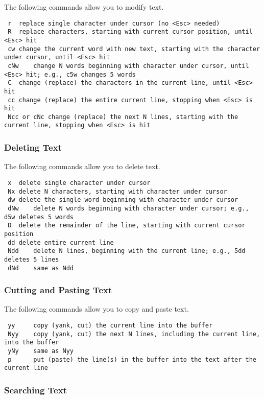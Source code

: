 The following commands allow you to modify text.

\begin{lstlisting}
 r	replace single character under cursor (no <Esc> needed)
 R	replace characters, starting with current cursor position, until <Esc> hit
 cw	change the current word with new text, starting with the character under cursor, until <Esc> hit
 cNw	change N words beginning with character under cursor, until <Esc> hit; e.g., c5w changes 5 words
 C	change (replace) the characters in the current line, until <Esc> hit
 cc	change (replace) the entire current line, stopping when <Esc> is hit
 Ncc or cNc	change (replace) the next N lines, starting with the current line, stopping when <Esc> is hit
\end{lstlisting}


\subsubsection{Deleting Text}

The following commands allow you to delete text.

\begin{lstlisting}
 x	delete single character under cursor
 Nx	delete N characters, starting with character under cursor
 dw	delete the single word beginning with character under cursor
 dNw	delete N words beginning with character under cursor; e.g., d5w deletes 5 words
 D	delete the remainder of the line, starting with current cursor position
 dd	delete entire current line
 Ndd 	delete N lines, beginning with the current line; e.g., 5dd deletes 5 lines
 dNd    same as Ndd
\end{lstlisting}


\subsubsection{Cutting and Pasting Text}

The following commands allow you to copy and paste text.

\begin{lstlisting}
 yy     copy (yank, cut) the current line into the buffer
 Nyy    copy (yank, cut) the next N lines, including the current line, into the buffer
 yNy    same as Nyy
 p      put (paste) the line(s) in the buffer into the text after the current line
\end{lstlisting}

\subsubsection{Searching Text}


